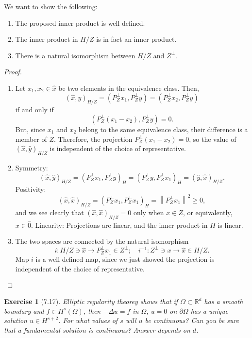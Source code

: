 \documentclass[letterpaper,twoside,11pt]{article}
\theoremstyle{mystyle}
\newtheorem*{exercise}{Exercise}
\newcommand{\R}{{\mathbb R}}
\begin{document}
We want to show the following: 
\begin{enumerate}
  \item The proposed inner product is well defined. 
  \item The inner product in $H/Z$ is in fact an inner product. 
  \item There is a natural isomorphism between $H/Z$ and $Z^\perp$. 
\end{enumerate}
\begin{proof}
  \begin{enumerate}
    \item Let $x_1, x_2 \in \hat x$ be two elements in the equivalence class. Then, 
    \[{\left( {\hat x,\hat y} \right)_{H/Z}} = \left( {P_Z^ \bot {x_1},P_Z^ \bot y} \right) = \left( {P_Z^ \bot {x_2},P_Z^ \bot y} \right)\]
    if and only if 
    \[\left( {P_Z^ \bot \left( {{x_1} - {x_2}} \right),P_Z^ \bot y} \right) = 0.\]
    But, since $x_1$ and $x_2$ belong to the same equivalence class, their difference is a member of $Z$. Therefore, the projection ${P_Z^ \bot \left( {{x_1} - {x_2}} \right)}=0$, so the value of ${\left( {\hat x,\hat y} \right)_{H/Z}}$ is independent of the choice of representative. 

    \item Symmetry: 
    \[{\left( {\hat x,\hat y} \right)_{H/Z}} = {\left( {P_Z^ \bot {x_1},P_Z^ \bot y} \right)_H} = {\left( {P_Z^ \bot y,P_Z^ \bot {x_1}} \right)_H} = {\left( {\hat y,\hat x} \right)_{H/Z}}.\]
    Positivity: 
    \[{\left( {\hat x,\hat x} \right)_{H/Z}} = {\left( {P_Z^ \bot {x_1},P_Z^ \bot {x_1}} \right)_H} = {\left\| {P_Z^ \bot {x_1}} \right\|^2} \geqslant 0,\]
    and we see clearly that $(\hat x, \hat x)_{H/Z} = 0$ only when $x \in Z$, or equivalently, $x\in \hat 0$. 
    Linearity: Projections are linear, and the inner product in $H$ is linear. 

    \item The two spaces are connected by the natural isomorphism 
    \[i:H/Z \ni \hat x \to P_Z^ \bot {x_1} \in {Z^ \bot };\quad {i^{ - 1}}:{Z^ \bot } \ni x \to \hat x \in H/Z.\]
    Map $i$ is a well defined map, since we just showed the projection is independent of the choice of representative. 
  \end{enumerate}
\end{proof}




\begin{exercise}[7.17]
  Elliptic regularity theorey shows that if $\Omega \subset \R^d$ has a smooth boundary and $f \in H^s\left( \Omega \right)$, then $-\Delta u = f$ in $\Omega$, $u = 0$ on $\partial \Omega$ has a unique solution $u \in H^{s+2}$. For what values of $s$ will $u$ be continuous? Can you be sure that a fundamental solution is continuous? Answer depends on $d$. 

\end{exercise}
\end{document}
